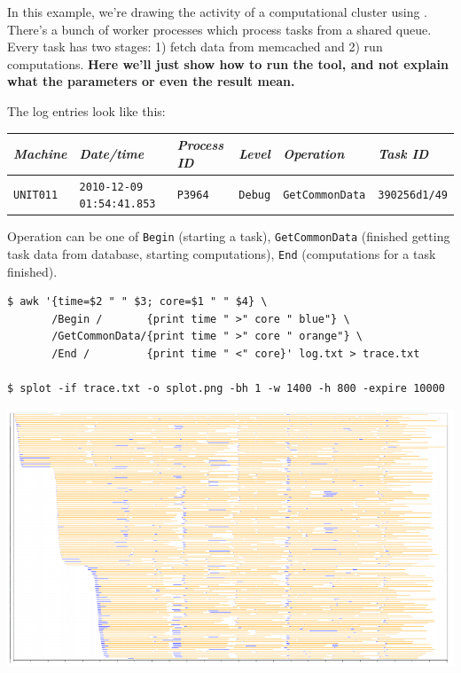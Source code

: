\documentclass{article}
\begin{document}
In this example, we're drawing the activity of a computational cluster using \splot{}. There's a bunch of worker processes which process tasks from a shared queue. Every task has two stages: 1) fetch data from memcached and 2) run computations. \textbf{Here we'll just show how to run the tool, and not explain what the parameters or even the result mean.}

The log entries look like this:

\begin{tabular}{|l|l|l|l|l|l|}
\hline
\emph{Machine} & \emph{Date/time} & \emph{Process ID} & \emph{Level} & \emph{Operation} & \emph{Task ID} \\
\hline
\footnotesize{\texttt{UNIT011}} & \footnotesize{\texttt{2010-12-09 01:54:41.853}} & \footnotesize{\texttt{P3964}} & \footnotesize{\texttt{Debug}} & \footnotesize{\texttt{GetCommonData}} & \footnotesize{\texttt{390256d1/49}} \\
\hline
\end{tabular}

Operation can be one of \verb|Begin| (starting a task), \verb|GetCommonData| (finished getting task data from database, starting computations), \verb|End| (computations for a task finished).

\begin{verbatim}
$ awk '{time=$2 " " $3; core=$1 " " $4} \
       /Begin /       {print time " >" core " blue"} \
       /GetCommonData/{print time " >" core " orange"} \
       /End /         {print time " <" core}' log.txt > trace.txt

$ splot -if trace.txt -o splot.png -bh 1 -w 1400 -h 800 -expire 10000
\end{verbatim}

{\centering \includegraphics[width=\textwidth]{pics/splot/splot-main-example.png}}
\end{document}

